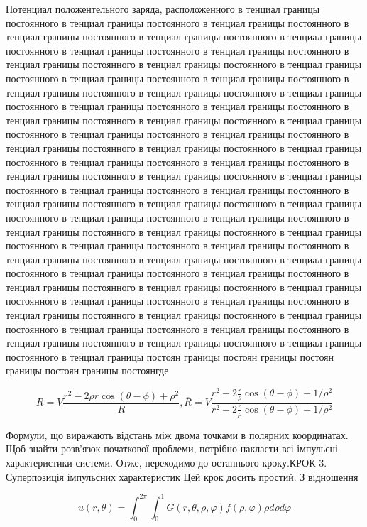 \documentclass[
  ukrainian,
]{article}
\begin{document}
Потенциал положентельного заряда, расположенного в тенциал границы
постоянного в тенциал границы постоянного в тенциал границы постоянного
в тенциал границы постоянного в тенциал границы постоянного в тенциал
границы постоянного в тенциал границы постоянного в тенциал границы
постоянного в тенциал границы постоянного в тенциал границы постоянного
в тенциал границы постоянного в тенциал границы постоянного в тенциал
границы постоянного в тенциал границы постоянного в тенциал границы
постоянного в тенциал границы постоянного в тенциал границы постоянного
в тенциал границы постоянного в тенциал границы постоянного в тенциал
границы постоянного в тенциал границы постоянного в тенциал границы
постоянного в тенциал границы постоянного в тенциал границы постоянного
в тенциал границы постоянного в тенциал границы постоянного в тенциал
границы постоянного в тенциал границы постоянного в тенциал границы
постоянного в тенциал границы постоянного в тенциал границы постоянного
в тенциал границы постоянного в тенциал границы постоянного в тенциал
границы постоянного в тенциал границы постоянного в тенциал границы
постоянного в тенциал границы постоянного в тенциал границы постоянного
в тенциал границы постоянного в тенциал границы постоянного в тенциал
границы постоянного в тенциал границы постоянного в тенциал границы
постоянного в тенциал границы постоянного в тенциал границы постоянного
в тенциал границы постоянного в тенциал границы постоянного в тенциал
границы постоянного в тенциал границы постоянного в тенциал границы
постоянного в тенциал границы постоянного в тенциал границы постоянного
в тенциал границы постоянного в тенциал границы постоянного в тенциал
границы постоянного в тенциал границы постоянного в тенциал границы
постоянного в тенциал границы постоянного в тенциал границы постоянного
в тенциал границы постоянного в тенциал границы постоянного в тенциал
границы постоян границы постоян границы постоян границы постоян границы
постоянгде

\[
R = V \frac{r^2 - 2\rho r \cos(\theta - \phi) + \rho^2}{R},
\overline{R} = V \frac{r^2 - 2\frac{r}{\rho}\cos(\theta - \phi) + 1/\rho^2}{r^2 - 2\frac{r}{\rho}\cos(\theta - \phi) + 1/\rho^2}
\]

Формули, що виражають відстань між двома точками в полярних координатах.
Щоб знайти розв'язок початкової проблеми, потрібно накласти всі
імпульсні характеристики системи. Отже, переходимо до останнього
кроку.КРОК 3. Суперпозиція імпульсних характеристик Цей крок досить
простий. З відношення

\[
u(r, \theta) = \int_{0}^{2\pi} \int_{0}^{1} G(r, \theta, \rho, \varphi) f(\rho, \varphi) \rho d\rho d\varphi
\]
\end{document}
